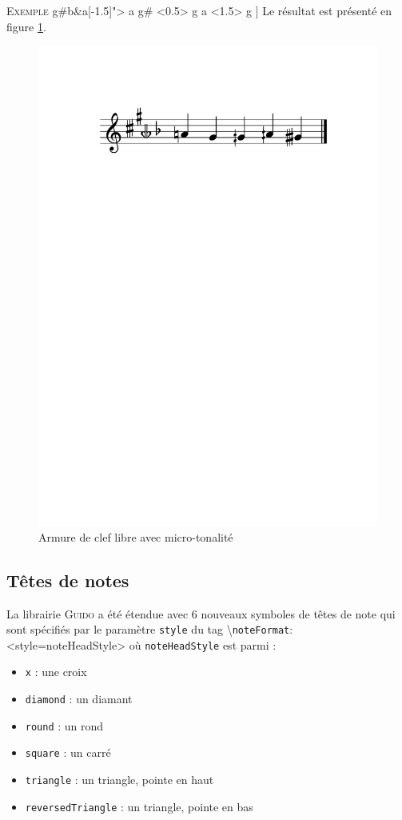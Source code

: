 \documentclass{article}
\newenvironment{gmncode}	{\vspace{-2mm}\small\verbatim}{\endverbatim\vspace{-2mm}}
\newcommand{\guido}			{\textsc{Guido}}
\newcommand{\code}[1]		{{\small \texttt{#1}}}
\newcommand{\guidotag}[1]	{\textbackslash\code{#1}}
\newcommand{\exemple}		{\vspace{2mm}\hspace*{-6mm}\textsc{Exemple}}
\begin{document}
\exemple
\begin{gmncode}
[
  \key<"free=c[1.5]g#b&a[-1.5]"> a g# 
  \alter<0.5> g  a \alter<1.5> g 
]
\end{gmncode}
Le résultat est présenté en figure \ref{fig:freekey}.
\begin{figure}[h]
\centering
\includegraphics[width=0.75\columnwidth]{img/partitions/freekey.pdf}
\caption{Armure de clef libre avec micro-tonalité}
\label{fig:freekey}
\end{figure}


\subsection{Têtes de notes}\label{subsec:tetes_notes}
%
La librairie \guido{} a été étendue avec 6 nouveaux symboles de têtes de note qui sont spécifiés par le paramètre \code{style} du tag \guidotag{noteFormat}:
\begin{gmncode}
  \noteFormat<style=noteHeadStyle>
\end{gmncode}
où \code{noteHeadStyle} est parmi :
\begin{itemize}
    \item \code{x} : une croix
    \item \code{diamond} : un diamant
    \item \code{round} : un rond
    \item \code{square} : un carré
    \item \code{triangle} : un triangle, pointe en haut
    \item \code{reversedTriangle} : un triangle, pointe en bas
\end{itemize} 
\end{document}
